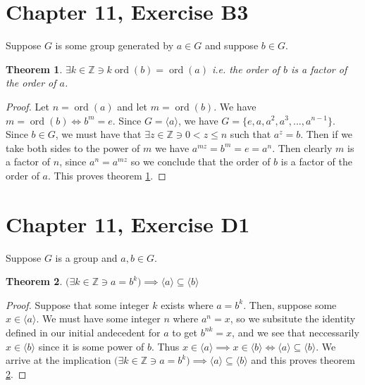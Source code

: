 \documentclass[12pt]{amsart}
\newcommand{\ints}{\mathbb{Z}}
\newcommand{\ord}{\operatorname{ord}}
\newtheorem{thm}{Theorem}
\begin{document}
\section{Chapter 11, Exercise B3}

Suppose $G$ is some group generated by $a \in G$
and suppose $b \in G$.

\begin{thm} \label{thm2}
	$\exists k \in \ints \ni k\ord(b) = \ord(a)$
	i.e. the order of $b$ is a factor of the order of $a$.
\end{thm}

\begin{proof}
	Let $n = \ord(a)$ and let $m = \ord(b)$.
	We have $m = \ord(b) \iff b^m = e$.
	Since $G = \langle a \rangle$,
	we have $G = \{e, a, a^2, a^3, ..., a^{n-1} \}$.
	Since $b \in G$, we must have that
	$\exists z \in \ints \ni 0 < z \le n$
	such that $a^z = b$.
	Then if we take both sides to the power of $m$
	we have $a^{mz} = b^m = e = a^n$.
	Then clearly $m$ is a factor of $n$,
	since $a^n = a^{mz}$
	so we conclude that
	the order of $b$ is a factor of the order of $a$.
	This proves theorem \ref{thm2}.
\end{proof}

\section{Chapter 11, Exercise D1}

Suppose $G$ is a group and $a,b \in G$.

\begin{thm} \label{thm3}
	$\Big(\exists k \in \ints \ni a = b^k \Big) \implies
	\langle a \rangle \subseteq \langle b \rangle$
\end{thm}

\begin{proof}
	Suppose that some integer $k$ exists
	where $a = b^k$.
	Then, suppose some $x \in \langle a \rangle$.
	We must have some integer $n$ where $a^n = x$,
	so we subsitute the identity defined in our
	initial andecedent for $a$ to get $b^{nk} = x$,
	and we see that neccessarily $x \in \langle b \rangle$
	since it is some power of $b$.
	Thus $x \in \langle a \rangle \implies x \in \langle b \rangle
	\iff \langle a \rangle \subseteq \langle b \rangle$.
	We arrive at the implication
	$\Big(\exists k \in \ints \ni a = b^k \Big) \implies
	\langle a \rangle \subseteq \langle b \rangle$
	and this proves theorem \ref{thm3}.
\end{proof}
\end{document}
